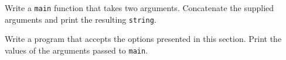 %
%
\begin{question}
Write a \verb|main| function that takes two arguments.
Concatenate the supplied arguments and print the resulting \verb|string|.
\end{question}

\begin{question}
Write a program that accepts the options presented in this
section. Print the values of the arguments passed to \verb|main|.
\end{question}
